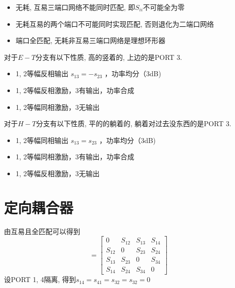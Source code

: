 \documentclass[a4paper]{report}
\begin{document}
\begin{itemize}
  \item 无耗, 互易三端口网络不能同时匹配, 即$S_{ii}$不可能全为零
  \item 无耗互易的两个端口不可能同时实现匹配, 否则退化为二端口网络
  \item 端口全匹配, 无耗非互易三端口网络是理想环形器
\end{itemize}

对于$E-T$分支有以下性质, 高的竖着的, 上边的是PORT 3. 
\begin{itemize}
  \item 1, 2等幅反相输出 $s_{13}= -s_{23}$ ，功率均分（3dB)
  \item 1, 2等幅反相激励，3有输出，功率合成
  \item 1, 2等幅同相激励，3无输出
\end{itemize}
对于$H-T$分支有以下性质, 平的的躺着的, 躺着对过去没东西的是PORT 3. 
\begin{itemize}
  \item 1, 2等幅同相输出 $s_{13}= s_{23}$ ，功率均分（3dB)
  \item 1, 2等幅同相激励，3有输出，功率合成
  \item 1, 2等幅反相激励，3无输出
\end{itemize}
\section{定向耦合器}
由互易且全匹配可以得到
\begin{equation}
  [S]=\begin{bmatrix}
    0&S_{12}&S_{13}&S_{14}
    \\S_{12}&0&S_{23}&S_{24}
    \\S_{13}&S_{23}&0&S_{34}
    \\S_{14}&S_{24}&S_{34}&0
  \end{bmatrix}
\end{equation}
设PORT 1, 4隔离, 得到$s_{14}=s_{41}=s_{32}=s_{32}=0$ 
\end{document}
